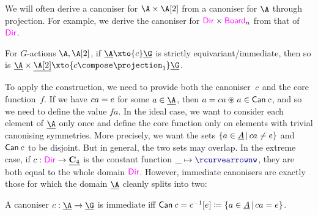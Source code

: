We will often derive a canoniser for $\A\times\B$ from a canoniser for
$\A$ through projection. For example, we
derive the canoniser for $\Direction\times\Board{n}$ from that of $\Direction$.

\begin{lemma}
  For $G$-actions $\A, \B$, if $\carrier \A \xto{\canoniser} \carrier
  \G$ is strictly equivariant/immediate, then so is
  $\carrier \A \times \carrier \B \xto{\canoniser
  \compose \projection_1} \carrier
  \G$.
\end{lemma}

To apply the \WLOG construction, we need to provide both the
canoniser~$c$ and the core function~$f$. If we have
$\canoniser a = \unit$ for some $a \in \carrier\A$, then $a =
\canoniser a \act a \in \Canon\canoniser$, and so we need to define
the value $f a$. In the ideal case, we want to consider each element
of $\carrier\A$ only once and define the core function only on
elements with trivial canonising symmetries. More precisely, we want
the sets $\set{a \in \carrier A \suchthat \canoniser a \ne \unit}$ and
$\mathop{\mathsf{Can}}\nolimits_{}{c}$ to be disjoint. But in general, the two sets may
overlap. In the extreme case, if
\(
  \canoniser : \Direction \to \carrier{\Cyc4}
\)
is the constant function
\(
  \fun{\_} \Rotation
\),
they are both equal to the whole domain $\Direction$. However,
immediate canonisers are exactly those for which the domain
$\carrier\A$ cleanly splits into two:

\begin{proposition}
  A canoniser $\canoniser : \carrier\A \to \carrier\G$ is immediate
  iff $\Canon\canoniser = \inv{\canoniser}[\unit] \definedby \set{a
  \in \carrier A \suchthat \canoniser a = \unit}$.
\end{proposition}
